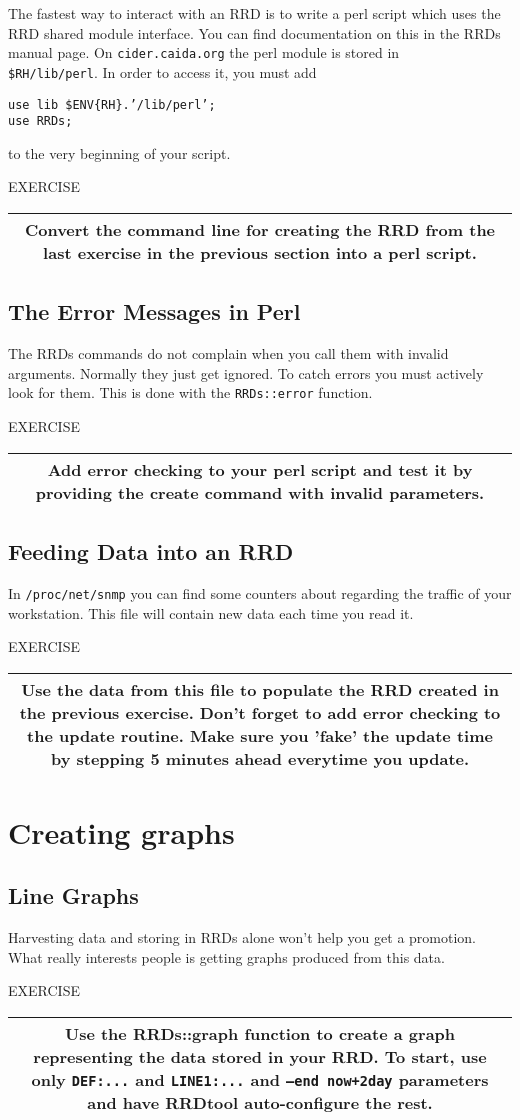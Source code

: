 \documentclass[a4paper,12pt]{article}
\newenvironment{work}{\textsf{\tiny EXERCISE}\nopagebreak\\[0.3ex]\begin{tabular}{|c|}
 \hline
 \begin{minipage}{0.965\linewidth}%
 \setlength{\parskip}{1.6ex plus 0.6ex minus 0.4ex}%
 \rule{0pt}{2.8ex}\ignorespaces}
{\rule[-1.8ex]{0pt}{0pt}\end{minipage}\\
 \hline
 \end{tabular}}
\newcommand{\ex}[1]{\subsection{#1}}
\newcommand{\cmd}[1]{\texttt{\mbox{#1}}}
\begin{document}
The fastest way to interact with an RRD is to write a perl script
which uses the RRD shared module interface. You can find documentation
on this in the RRDs manual page. On \cmd{cider.caida.org} the perl module is
stored in\\ \cmd{\$RH/lib/perl}. In order to access it, you must
add 

\cmd{use lib \$ENV\{RH\}.'/lib/perl';}\\
\cmd{use RRDs;}


to the very beginning of your script.

\begin{work}
Convert the command line for creating the RRD from the last exercise
in the previous section into a perl script.
\end{work}

\ex{The Error Messages in Perl}
The RRDs commands do not complain when you call them with invalid
arguments. Normally they just get ignored. To catch errors you must
actively look for them. This is done with the \cmd{RRDs::error}
function.

\begin{work}
Add error checking to your perl script and test it by providing the
create command with invalid parameters.
\end{work}

\newpage
\ex{Feeding Data into an RRD}
In \cmd{/proc/net/snmp} you can find some counters about regarding the
traffic of your workstation. This file will contain new data each time you read it.

\begin{work}
  Use the data from this file to populate the RRD created in the previous
  exercise. Don't forget to add error checking to the update routine. Make
  sure you 'fake' the update time by stepping 5 minutes ahead everytime you
  update.
\end{work}

\section{Creating graphs}

\ex{Line Graphs}
Harvesting data and storing in RRDs alone won't help you get a
promotion. What really interests people is getting graphs produced from
this data.

\begin{work}
Use the RRDs::graph function to create a graph representing the data
stored in your RRD. To start, use only \cmd{DEF:...} and \cmd{LINE1:...}
and \cmd{--end now+2day} parameters and have RRDtool
auto-configure the rest. 
\end{work}
\end{document}
